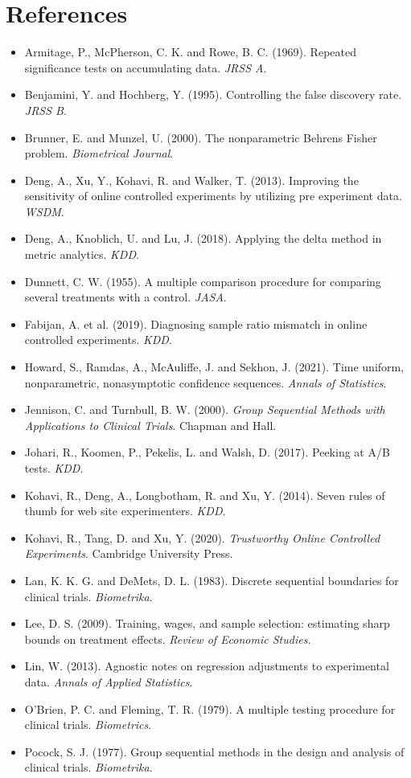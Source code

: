 \documentclass[10pt]{article}
\begin{document}
\section*{References}
\small
\begin{itemize}\setlength{\itemsep}{1pt}
\item Armitage, P., McPherson, C. K. and Rowe, B. C. (1969). Repeated significance tests on accumulating data. \textit{JRSS A}.
\item Benjamini, Y. and Hochberg, Y. (1995). Controlling the false discovery rate. \textit{JRSS B}.
\item Brunner, E. and Munzel, U. (2000). The nonparametric Behrens Fisher problem. \textit{Biometrical Journal}.
\item Deng, A., Xu, Y., Kohavi, R. and Walker, T. (2013). Improving the sensitivity of online controlled experiments by utilizing pre experiment data. \textit{WSDM}.
\item Deng, A., Knoblich, U. and Lu, J. (2018). Applying the delta method in metric analytics. \textit{KDD}.
\item Dunnett, C. W. (1955). A multiple comparison procedure for comparing several treatments with a control. \textit{JASA}.
\item Fabijan, A. et al. (2019). Diagnosing sample ratio mismatch in online controlled experiments. \textit{KDD}.
\item Howard, S., Ramdas, A., McAuliffe, J. and Sekhon, J. (2021). Time uniform, nonparametric, nonasymptotic confidence sequences. \textit{Annals of Statistics}.
\item Jennison, C. and Turnbull, B. W. (2000). \textit{Group Sequential Methods with Applications to Clinical Trials}. Chapman and Hall.
\item Johari, R., Koomen, P., Pekelis, L. and Walsh, D. (2017). Peeking at A/B tests. \textit{KDD}.
\item Kohavi, R., Deng, A., Longbotham, R. and Xu, Y. (2014). Seven rules of thumb for web site experimenters. \textit{KDD}.
\item Kohavi, R., Tang, D. and Xu, Y. (2020). \textit{Trustworthy Online Controlled Experiments}. Cambridge University Press.
\item Lan, K. K. G. and DeMets, D. L. (1983). Discrete sequential boundaries for clinical trials. \textit{Biometrika}.
\item Lee, D. S. (2009). Training, wages, and sample selection: estimating sharp bounds on treatment effects. \textit{Review of Economic Studies}.
\item Lin, W. (2013). Agnostic notes on regression adjustments to experimental data. \textit{Annals of Applied Statistics}.
\item O'Brien, P. C. and Fleming, T. R. (1979). A multiple testing procedure for clinical trials. \textit{Biometrics}.
\item Pocock, S. J. (1977). Group sequential methods in the design and analysis of clinical trials. \textit{Biometrika}.
\end{itemize}
\end{document}
